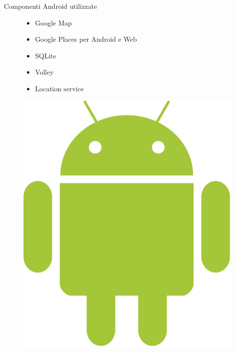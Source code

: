 \documentclass[10pt,a4paper]{beamer}
\begin{document}
\begin{frame}{Componenti Android utilizzate}
\begin{figure}

\begin{minipage}{0.47\textwidth}
   \begin{itemize}
      \item Google Map
      \item Google Places per Android e Web
      \item SQLite
      \item Volley
      \item Location service
   \end{itemize}
\end{minipage}
\hfill 
\begin{minipage}{0.35\textwidth}

   \includegraphics[scale=0.1]{Android_robot.png}

\end{minipage}

\end{figure}

\end{frame}
\end{document}
